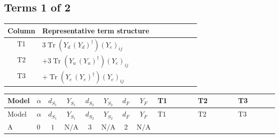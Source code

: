 \documentclass[8pt]{article}
\begin{document}
\begin{landscape}
\subsection*{Terms 1 of 2}
\begin{center}
\begin{tabular}{@{}c >{\raggedright\arraybackslash}p{0.82\linewidth}@{}}
\toprule
Column & Representative term structure \\
\midrule
T1 & \(\displaystyle 3 \operatorname{Tr}\!\left({Y_d}\,\left({Y_d}\right)^{\dagger}\right) \left({Y_e}\right)_{ij}\) \\
\midrule
T2 & \(\displaystyle +3 \operatorname{Tr}\!\left({Y_u}\,\left({Y_u}\right)^{\dagger}\right) \left({Y_e}\right)_{ij}\) \\
\midrule
T3 & \(\displaystyle +\operatorname{Tr}\!\left({Y_e}\,\left({Y_e}\right)^{\dagger}\right) \left({Y_e}\right)_{ij}\) \\
\midrule
\bottomrule
\end{tabular}
\end{center}
\smallskip
\tiny
\begin{longtable}{@{}llcccccc >{\raggedright\arraybackslash}p{0.21\linewidth} >{\raggedright\arraybackslash}p{0.21\linewidth} >{\raggedright\arraybackslash}p{0.21\linewidth}@{}}
\toprule
Model & $\alpha$ & $d_{S_1}$ & $Y_{S_1}$ & $d_{S_2}$ & $Y_{S_2}$ & $d_F$ & $Y_F$ & T1 & T2 & T3 \\
\midrule
\endfirsthead
\toprule
Model & $\alpha$ & $d_{S_1}$ & $Y_{S_1}$ & $d_{S_2}$ & $Y_{S_2}$ & $d_F$ & $Y_F$ & T1 & T2 & T3 \\
\midrule
\endhead
A & $0$ & $1$ & $\text{N/A}$ & $3$ & $\text{N/A}$ & $2$ & $\text{N/A}$ & \scriptsize\adjustbox{max width=\linewidth}{$\begin{gathered} 3 \operatorname{Tr}\!\left({Y_d}\,\left({Y_d}\right)^{\dagger}\right) \left({Y_e}\right)_{ij}\end{gathered}$} & \scriptsize\adjustbox{max width=\linewidth}{$\begin{gathered} +3 \operatorname{Tr}\!\left({Y_u}\,\left({Y_u}\right)^{\dagger}\right) \left({Y_e}\right)_{ij}\end{gathered}$} & \scriptsize\adjustbox{max width=\linewidth}{$\begin{gathered} +\operatorname{Tr}\!\left({Y_e}\,\left({Y_e}\right)^{\dagger}\right) \left({Y_e}\right)_{ij}\end{gathered}$} \\
\midrule

\end{longtable}
\end{landscape}
\end{document}
